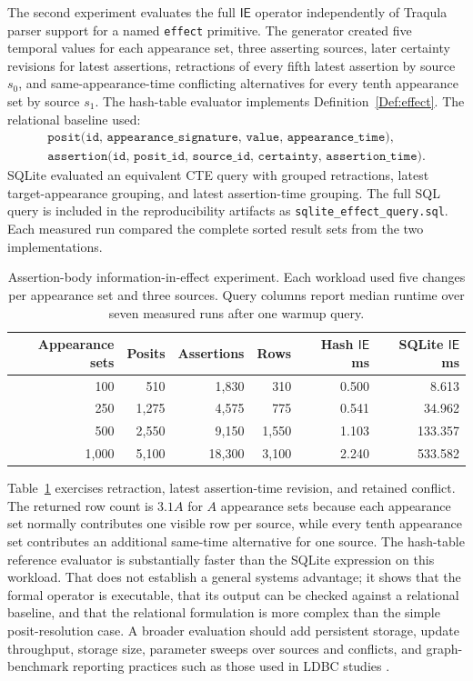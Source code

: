 \documentclass[a4paper,fleqn]{cas-sc}
\newcommand{\ie}{\mathsf{IE}}
\theoremstyle{plain}
\theoremstyle{remark}
\begin{document}
The second experiment evaluates the full \(\ie\) operator independently of Traqula parser support for a named \texttt{effect} primitive. The generator created five temporal values for each appearance set, three asserting sources, later certainty revisions for latest assertions, retractions of every fifth latest assertion by source \(s_0\), and same-appearance-time conflicting alternatives for every tenth appearance set by source \(s_1\). The hash-table evaluator implements Definition~\ref{Def:effect}. The relational baseline used:
\[
\begin{array}{l}
\texttt{posit(id, appearance\_signature, value, appearance\_time)},\\
\texttt{assertion(id, posit\_id, source\_id, certainty, assertion\_time)}.
\end{array}
\]
SQLite evaluated an equivalent CTE query with grouped retractions, latest target-appearance grouping, and latest assertion-time grouping. The full SQL query is included in the reproducibility artifacts as \texttt{sqlite\_effect\_query.sql}. Each measured run compared the complete sorted result sets from the two implementations.

\begin{table}[t]
\centering
\small
\begin{tabular}{r r r r r r}
\toprule
Appearance sets & Posits & Assertions & Rows & Hash \(\ie\) ms & SQLite \(\ie\) ms \\
\midrule
100 & 510 & 1,830 & 310 & 0.500 & 8.613 \\
250 & 1,275 & 4,575 & 775 & 0.541 & 34.962 \\
500 & 2,550 & 9,150 & 1,550 & 1.103 & 133.357 \\
1,000 & 5,100 & 18,300 & 3,100 & 2.240 & 533.582 \\
\bottomrule
\end{tabular}
\caption{Assertion-body information-in-effect experiment. Each workload used five changes per appearance set and three sources. Query columns report median runtime over seven measured runs after one warmup query.}
\label{Table:assertion-effect}
\end{table}

Table~\ref{Table:assertion-effect} exercises retraction, latest assertion-time revision, and retained conflict. The returned row count is \(3.1A\) for \(A\) appearance sets because each appearance set normally contributes one visible row per source, while every tenth appearance set contributes an additional same-time alternative for one source. The hash-table reference evaluator is substantially faster than the SQLite expression on this workload. That does not establish a general systems advantage; it shows that the formal operator is executable, that its output can be checked against a relational baseline, and that the relational formulation is more complex than the simple posit-resolution case. A broader evaluation should add persistent storage, update throughput, storage size, parameter sweeps over sources and conflicts, and graph-benchmark reporting practices such as those used in LDBC studies \cite{AnglesEtAl2020,QiEtAl2023}.
\end{document}
